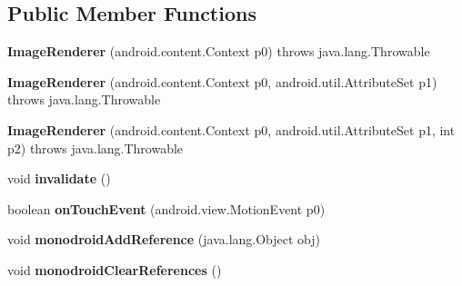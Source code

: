 \subsection*{Public Member Functions}
\begin{DoxyCompactItemize}
\item 
\mbox{\label{classmd57018357d52b54713cd814fbd5262dd1f_1_1ImageRenderer_a75085da3c8269f5e0e8053ea9f2804a7}} 
{\bfseries Image\+Renderer} (android.\+content.\+Context p0)  throws java.\+lang.\+Throwable 	
\item 
\mbox{\label{classmd57018357d52b54713cd814fbd5262dd1f_1_1ImageRenderer_a0947c7c3bb9345bab25385a875725446}} 
{\bfseries Image\+Renderer} (android.\+content.\+Context p0, android.\+util.\+Attribute\+Set p1)  throws java.\+lang.\+Throwable 	
\item 
\mbox{\label{classmd57018357d52b54713cd814fbd5262dd1f_1_1ImageRenderer_a4cbfa52301eb9f06d519eac869c63a3a}} 
{\bfseries Image\+Renderer} (android.\+content.\+Context p0, android.\+util.\+Attribute\+Set p1, int p2)  throws java.\+lang.\+Throwable 	
\item 
\mbox{\label{classmd57018357d52b54713cd814fbd5262dd1f_1_1ImageRenderer_a037c35822acfdc7a7644cd23d45c4a00}} 
void {\bfseries invalidate} ()
\item 
\mbox{\label{classmd57018357d52b54713cd814fbd5262dd1f_1_1ImageRenderer_a0138cd2d209b20e20429b8d025a44a6a}} 
boolean {\bfseries on\+Touch\+Event} (android.\+view.\+Motion\+Event p0)
\item 
\mbox{\label{classmd57018357d52b54713cd814fbd5262dd1f_1_1ImageRenderer_a8a59b5b90d807e540c86a0c578f715f8}} 
void {\bfseries monodroid\+Add\+Reference} (java.\+lang.\+Object obj)
\item 
\mbox{\label{classmd57018357d52b54713cd814fbd5262dd1f_1_1ImageRenderer_a728618eb60ebbc2bb870cd135d007a76}} 
void {\bfseries monodroid\+Clear\+References} ()
\end{DoxyCompactItemize}
